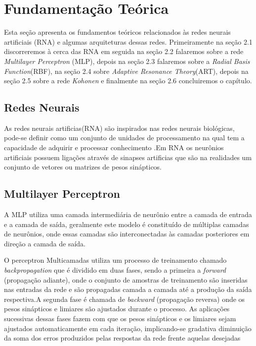 \chapter{Fundamentação Teórica}
\label{cap:fundamentacao-teorica}

Esta seção apresenta os fundamentos teóricos relacionados às redes
neurais artificiais (RNA) e algumas arquiteturas dessas redes. Primeiramente na seção 2.1 discorreremos à cerca das RNA em seguida na seção 2.2 falaremos sobre a rede \textit{Multilayer Perceptron} (MLP), depois na seção 2.3 falaremos sobre a \textit{Radial Basis Function}(RBF), na seção 2.4 sobre \textit{Adaptive Resonance Theory}(ART), depois na seção 2.5 sobre a rede \textit{Kohonen} e finalmente na seção 2.6 concluiremos o capítulo.

\section{Redes Neurais}
\label{sec:redes-neurais}

As redes neurais artificias(RNA) são inspirados nas redes neurais biológicas, pode-se definir como um conjunto de unidades de processamento na qual tem a capacidade de adquirir e processar conhecimento \cite{silva2010redes}.Em RNA os neurônios artificiais possuem ligações através de sinapses artificias que são na realidades um conjunto de vetores ou matrizes de pesos sinápticos.








\section{Multilayer Perceptron}
\label{sec:multilayer-perceptron}

A MLP utiliza uma camada intermediária de neurônio entre a camada de entrada e a camada de saída, geralmente este modelo é constituído de múltiplas camadas de neurônios, onde essas camadas são interconectadas às camadas posteriores em direção a camada de saída. 

O perceptron Multicamadas utiliza um processo de treinamento chamado \textit{backpropagation} que é dividido em duas fases, sendo a primeira a \textit{forward} (propagação adiante), onde o conjunto de amostras de treinamento são inseridas nas entradas da rede e são propagadas camada a camada até a produção da saída respectiva.A segunda fase é chamada de \textit{backward} (propagação reversa) onde os pesos sinápticos e limiares são ajustados durante o processo.
 As aplicações sucessivas dessas fases fazem com que os pesos sinápticos e os limiares sejam ajustados automaticamente em cada iteração, implicando-se gradativa diminuição da soma dos erros produzidos pelas respostas da rede frente aquelas desejadas





